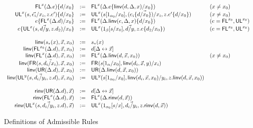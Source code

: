 \begin{figure}
\begin{small}
\[\begin{array}{rcll}
\mathsf{FL}^{x}(\Delta.e)\{d/x_0\} & := & \mathsf{FL}^{x}(\Delta.e\{\mathsf{linv}(d,\Delta,x)/x_0\}) & (x \neq x_0) \\
\mathsf{UL}^{x}_{}(s,\vec{e_i}/x_i,z.e')\{d/x_0\} & := & {\mathsf{UL}^{x}_{}(s[1_{\alpha_0}/x_0],\vec{(e_i\{d/x_0\})/x_i},z.e'\{d/x_0\})} & (x \neq x_0)\\
e\{\mathsf{FL}^{x}(\Delta.d)/x_0\} & := & \mathsf{FL}^{x}(\Delta.\mathsf{linv}(e,\Delta,x)\{d/x_0\}) & (e = \mathsf{FL}^{x_0},\mathsf{UL}^{x_0})\\
e\{\mathsf{UL}^{x}_{}(s,\vec{d/y},z.d_2)/x_0\} & := & \mathsf{UL}^{x}_{}(1_\beta[s/x_0],\vec{d/y},z.e\{d_2/x_0\}) & (e = \mathsf{FL}^{x_0},\mathsf{UL}^{x_0}) \\
\\
\mathsf{linv}(s_*(x),\vec{x},x_0) & := & {s_*(x)}\\
\mathsf{linv}(\mathsf{FL}^{x_0}(\Delta.d),\vec{x},x_0) & := & d[\Delta \leftrightarrow \vec{x}]\\
\mathsf{linv}(\mathsf{FL}^{x}(\Delta.d),\vec{x},x_0) & := & \mathsf{FL}^{x}(\Delta.\mathsf{linv}(d,\vec{x},x_0)) & (x \neq x_0)\\
\mathsf{linv}(\mathsf{FR}_{}(s,\vec{d_i/x_i}),\vec{x},x_0) & := & \mathsf{FR}_{}(s[1_\alpha/x_0],{{\mathsf{linv}(d_i,\vec{x},y)}/x_i}) \\
\mathsf{linv}(\mathsf{UR}(\Delta.d),\vec{x},x_0) & := & \mathsf{UR}(\Delta.\mathsf{linv}(d,\vec{x},x_0)) & \\
\mathsf{linv}(\mathsf{UL}^{y}_{}(s,\vec{d_i/y_i},z.d),\vec{x},x_0) & := & \mathsf{UL}^{y}_{}(s[1_{\alpha_0}/x_0],\mathsf{linv}(d_i,\vec{x},x_0)/y_i,z.\mathsf{linv}(d,\vec{x},x_0)) & \\
\\
\mathsf{rinv}(\mathsf{UR}(\Delta.d),\vec{x}) & := & d[\Delta \leftrightarrow \vec{x}]\\
\mathsf{rinv}(\mathsf{FL}^{x}(\Delta.d),\vec{x}) & := & \mathsf{FL}^{x}(\Delta.\mathsf{rinv}(d,\vec{x})) \\
\mathsf{rinv}(\mathsf{UL}^{x}_{}(s,\vec{d_i/y_i},z.d),\vec{x}) & := & \mathsf{UL}^{x}_{}(1_{\alpha_0}[s/x],\vec{d_i/y_i},z.\mathsf{rinv}(d,\vec{x}))\\
\end{array}
\]
\end{small}
\caption{Definitions of Admissible Rules}
\label{fig:admissible-rule-equations}
\end{figure}

